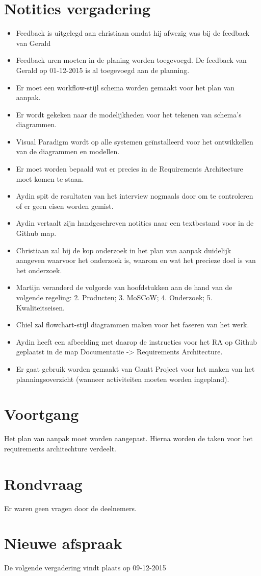 \documentclass[dutch]{hu}
\begin{document}
\section{Notities vergadering}
\begin{itemize}

\item Feedback is uitgelegd aan christiaan omdat hij afwezig was bij de feedback van Gerald
\item Feedback uren moeten in de planing worden toegevoegd. De feedback van Gerald op 01-12-2015 is al toegevoegd aan de planning.
\item Er moet een workflow-stijl schema worden gemaakt voor het plan van aanpak.
\item Er wordt gekeken naar de modelijkheden voor het tekenen van schema's diagrammen.
\item Visual Paradigm wordt op alle systemen geïnstalleerd voor het ontwikkellen van de diagrammen en modellen.
\item Er moet worden bepaald wat er precies in de Requirements Architecture moet komen te staan.
\item Aydin spit de resultaten van het interview nogmaals door om te controleren of er geen eisen worden gemist.
\item Aydin vertaalt zijn handgeschreven notities naar een textbestand voor in de Github map.
\item Christiaan zal bij de kop onderzoek in het plan van aanpak duidelijk aangeven waarvoor het onderzoek is, waarom en wat het precieze doel is van het onderzoek.
\item Martijn veranderd de volgorde van hoofdstukken aan de hand van de volgende regeling: 2. Producten; 3. MoSCoW; 4. Onderzoek; 5. Kwaliteitseisen.
\item Chiel zal flowchart-stijl diagrammen maken voor het faseren van het werk.
\item Aydin heeft een afbeelding met daarop de instructies voor het RA op Github geplaatst in de map Documentatie -> Requirements Architecture.
\item Er gaat gebruik worden gemaakt van Gantt Project voor het maken van het planningsoverzicht (wanneer activiteiten moeten worden ingepland).

\end{itemize}

\section{Voortgang}
Het plan van aanpak moet worden aangepast. Hierna worden de taken voor het requirements architechture verdeelt.

\section{Rondvraag}
Er waren geen vragen door de deelnemers.

\section{Nieuwe afspraak}
De volgende vergadering vindt plaats op 09-12-2015
\end{document}
